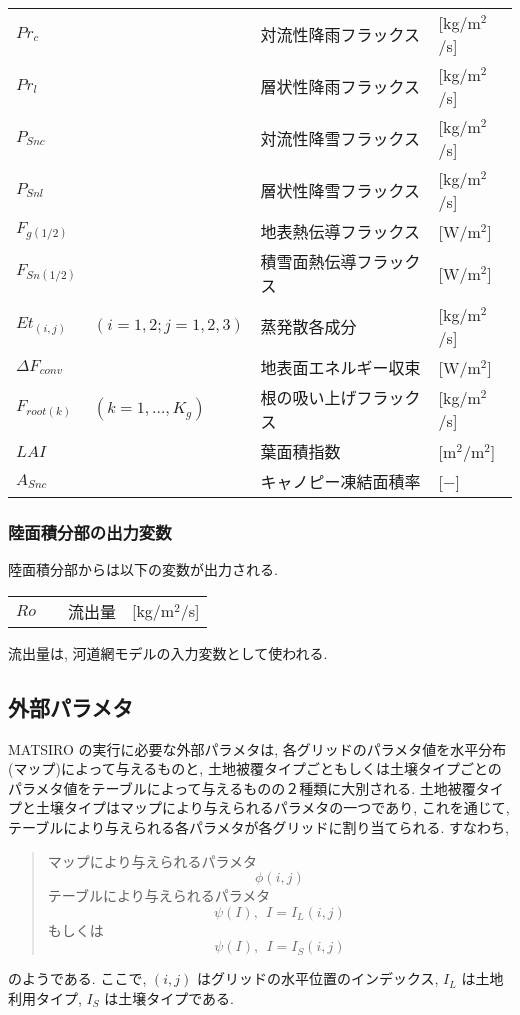 \begin{tabular}{llll}
$Pr_{c}$       &                     & 対流性降雨フラックス & [kg/m$^2$/s] \\
$Pr_{l}$       &                     & 層状性降雨フラックス & [kg/m$^2$/s] \\
$P_{Snc}$      &                     & 対流性降雪フラックス & [kg/m$^2$/s] \\
$P_{Snl}$      &                     & 層状性降雪フラックス & [kg/m$^2$/s] \\
$F_{g(1/2)}$      &                     & 地表熱伝導フラックス & [W/m$^2$] \\
$F_{Sn(1/2)}$     &                     & 積雪面熱伝導フラックス & [W/m$^2$] \\
$Et_{(i,j)}$   & $(i=1,2;j=1,2,3)$   & 蒸発散各成分   & [kg/m$^2$/s] \\
$\Delta F_{conv}$&                     & 地表面エネルギー収束 & [W/m$^2$] \\
$F_{root(k)}$      & $(k=1,\ldots,K_g)$  & 根の吸い上げフラックス & [kg/m$^2$/s] \\
$LAI$          &                     & 葉面積指数 & [m$^2$/m$^2$] \\
$A_{Snc}$     &                     & キャノピー凍結面積率 & [$-$] \\
\end{tabular}
\medskip

\subsubsection{陸面積分部の出力変数}

陸面積分部からは以下の変数が出力される. 

\begin{tabular}{llll}
$Ro$           &                     & 流出量             & [kg/m$^2$/s] \\
\end{tabular}
\medskip

流出量は, 河道網モデルの入力変数として使われる. 

\subsection{外部パラメタ}

MATSIRO の実行に必要な外部パラメタは, 各グリッドのパラメタ値を水平分布
(マップ)によって与えるものと, 土地被覆タイプごともしくは土壌タイプごとの
パラメタ値をテーブルによって与えるものの２種類に大別される. 土地被覆タイ
プと土壌タイプはマップにより与えられるパラメタの一つであり, これを通じて,
テーブルにより与えられる各パラメタが各グリッドに割り当てられる. すなわち, 
\begin{quote}
 マップにより与えられるパラメタ
 \[
 \phi(i,j)
 \]
 テーブルにより与えられるパラメタ
 \[
 \psi(I), \ \ I = I_L(i,j)
 \]
もしくは
 \[
 \psi(I), \ \ I = I_S(i,j)
 \]
\end{quote}
のようである. ここで, $(i,j)$ はグリッドの水平位置のインデックス, $I_L$
は土地利用タイプ, $I_S$ は土壌タイプである. 

